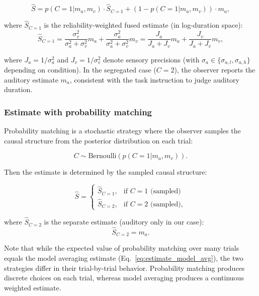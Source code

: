 \documentclass[9pt,lineno,doublespacing]{elife}
\begin{document}
\begin{equation}
\hat{S} = p(C=1 | m_a, m_v) \cdot \hat{S}_{C=1} + (1 - p(C=1 | m_a, m_v)) \cdot m_a,
\end{equation}

where $\hat{S}_{C=1}$ is the reliability-weighted fused estimate (in log-duration space):
\begin{equation}
\hat{S}_{C=1} = \frac{\sigma_v^2}{\sigma_a^2 + \sigma_v^2} m_a + \frac{\sigma_a^2}{\sigma_a^2 + \sigma_v^2} m_v 
= \frac{J_a}{J_a + J_v} m_a + \frac{J_v}{J_a + J_v} m_v,
\end{equation}

where $J_a = 1/\sigma_a^2$ and $J_v = 1/\sigma_v^2$ denote sensory precisions (with $\sigma_a \in \{\sigma_{a,l}, \sigma_{a,h}\}$ depending on condition). In the segregated case ($C=2$), the observer reports the auditory estimate $m_a$, consistent with the task instruction to judge auditory duration.


\subsubsection{Estimate with probability matching}

Probability matching is a stochastic strategy where the observer samples the causal structure from the posterior distribution on each trial:

\begin{equation}
\label{eq:probability_matching_sample}
C \sim \text{Bernoulli}(p(C=1 | m_a, m_v)).
\end{equation}

Then the estimate is determined by the sampled causal structure:

\begin{equation}
\label{eq:estimate_matching}
\hat{S} = \begin{cases}
\hat{S}_{C=1}, & \text{if } C = 1 \text{ (sampled)} \\
\hat{S}_{C=2}, & \text{if } C = 2 \text{ (sampled)},
\end{cases}
\end{equation}

where $\hat{S}_{C=2}$ is the separate estimate (auditory only in our case):
\begin{equation}
\hat{S}_{C=2} = m_a.
\end{equation}

Note that while the expected value of probability matching over many trials equals the model averaging estimate (Eq.~\ref{eq:estimate_model_avg}), the two strategies differ in their trial-by-trial behavior. Probability matching produces discrete choices on each trial, whereas model averaging produces a continuous weighted estimate.
\end{document}
